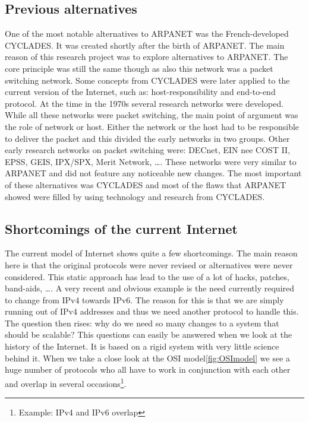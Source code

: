 \subsection{Previous alternatives}

One of the most notable alternatives to ARPANET was the French-developed CYCLADES. It was created shortly after the birth of ARPANET. The main reason of this research project was to explore alternatives to ARPANET. The core principle was still the same though as also this network was a packet switching network. Some concepts from CYCLADES were later applied to the current version of the Internet, such as: host-responsibility and end-to-end protocol. 
\npar
At the time in the 1970s several research networks were developed. While all these networks were packet switching, the main point of argument was the role of network or host. Either the network or the host had to be responsible to deliver the packet and this divided the early networks in two groups. Other early research networks on packet switching were: DECnet, EIN nee COST II, EPSS, GEIS, IPX/SPX, Merit Network, \ldots. These networks were very similar to ARPANET and did not feature any noticeable new changes. The most important of these alternatives was CYCLADES and most of the flaws that ARPANET showed were filled by using technology and research from CYCLADES.

\subsection{Shortcomings of the current Internet}
\label{ssec:Internet_shortcomings}

The current model of Internet shows quite a few shortcomings. The main reason here is that the original protocols were never revised or alternatives were never considered. This static approach has lead to the use of a lot of hacks, patches, band-aids, \ldots. A very recent and obvious example is the need currently required to change from IPv4 towards IPv6. The reason for this is that we are simply running out of IPv4 addresses and thus we need another protocol to handle this. The question then rises: why do we need so many changes to a system that should be scalable? This questions can easily be answered when we look at the history of the Internet. It is based on a rigid system with very little science behind it. When we take a close look at the OSI model\ref{fig:OSImodel} we see a huge number of protocols who all have to work in conjunction with each other and overlap in several occasions\footnote{Example: IPv4 and IPv6 overlap}. 

